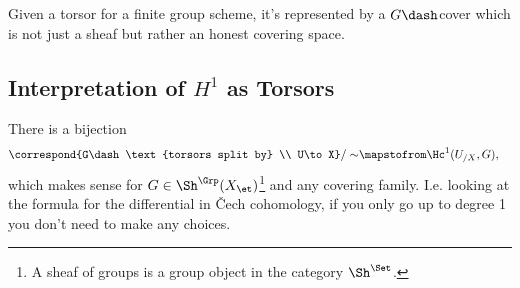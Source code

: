 \begin{remark}

Given a torsor for a finite group scheme, it's represented by a
\(G\dash\)cover which is not just a sheaf but rather an honest covering
space.

\end{remark}

\hypertarget{interpretation-of-h1-as-torsors}{%
\subsection{\texorpdfstring{Interpretation of \(H^1\) as
Torsors}{Interpretation of H\^{}1 as Torsors}}\label{interpretation-of-h1-as-torsors}}

\begin{proposition}[Interpretation of $H^1$]

There is a bijection
\begin{align*}  
\correspond{G\dash\text{torsors split by} \\ U\to X} / \sim
&\mapstofrom
\Hc^1(U_{/X}, G)
,\end{align*} which makes sense for \(G\in \Sh^\Grp(X_\et)\)\footnote{A
  sheaf of groups is a group object in the category \(\Sh^\Set\).} and
any covering family. I.e. looking at the formula for the differential in
Čech cohomology, if you only go up to degree 1 you don't need to make
any choices.

\end{proposition}

